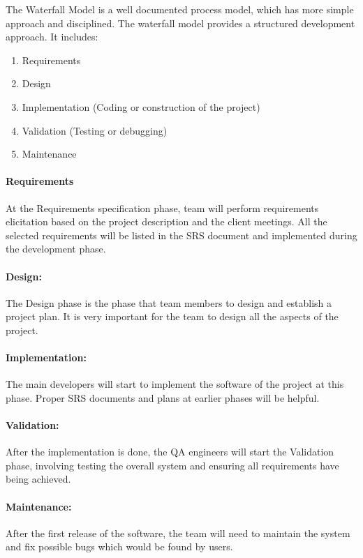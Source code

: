 \documentclass[11pt, a4paper]{report}
\begin{document}
The Waterfall Model is a well documented process model, which has more simple approach and disciplined. The waterfall model provides a structured development approach. It includes:
\begin{enumerate}
	\item  Requirements
	\item  Design
	\item  Implementation (Coding or construction of the project)
	\item  Validation (Testing or debugging)
	\item  Maintenance
\end{enumerate}

\paragraph{Requirements}
At the Requirements specification phase, team will perform requirements elicitation based on the project description and the client meetings. All the selected requirements will be listed in the SRS document and implemented during the development phase.

\paragraph{Design:}
The Design phase is the phase that team members to design and establish a project plan. It is very important for the team to design all the aspects of the project.

\paragraph{Implementation:}
The main developers will start to implement the software of the project at this phase. Proper SRS documents and plans at earlier phases will be helpful. 

\paragraph{Validation:}
After the implementation is done, the QA engineers will start the Validation phase, involving testing the overall system and ensuring all requirements have being achieved. 

\paragraph{Maintenance:}
After the first release of the software, the team will need to maintain the system and fix possible bugs which would be found by users.
\end{document}
